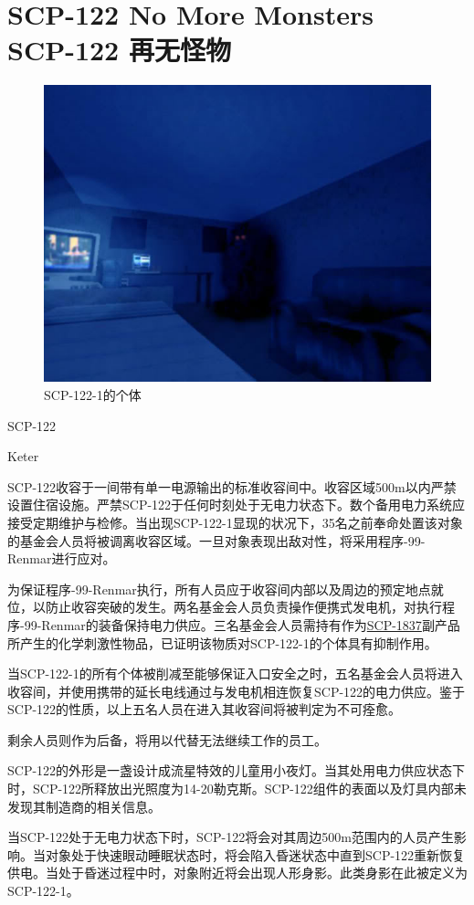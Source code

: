 \chapter[SCP-122 再无怪物]{
    SCP-122 No More Monsters\\
    SCP-122 再无怪物
}

\label{chap:SCP-122}

\begin{figure}[H]
    \centering
    \includegraphics[width=0.5\linewidth]{images/SCP-122.jpg}
    \caption*{SCP-122-1的个体}
\end{figure}

SCP-122

Keter

SCP-122收容于一间带有单一电源输出的标准收容间中。收容区域500m以内严禁设置住宿设施。严禁SCP-122于任何时刻处于无电力状态下。数个备用电力系统应接受定期维护与检修。当出现SCP-122-1显现的状况下，35名之前奉命处置该对象的基金会人员将被调离收容区域。一旦对象表现出敌对性，将采用程序-99-Renmar进行应对。

为保证程序-99-Renmar执行，所有人员应于收容间内部以及周边的预定地点就位，以防止收容突破的发生。两名基金会人员负责操作便携式发电机，对执行程序-99-Renmar的装备保持电力供应。三名基金会人员需持有作为\hyperref[chap:SCP-1837]{SCP-1837}副产品所产生的化学刺激性物品，已证明该物质对SCP-122-1的个体具有抑制作用。

当SCP-122-1的所有个体被削减至能够保证入口安全之时，五名基金会人员将进入收容间，并使用携带的延长电线通过与发电机相连恢复SCP-122的电力供应。鉴于SCP-122的性质，以上五名人员在进入其收容间将被判定为不可痊愈。

剩余人员则作为后备，将用以代替无法继续工作的员工。

SCP-122的外形是一盏设计成流星特效的儿童用小夜灯。当其处用电力供应状态下时，SCP-122所释放出光照度为14-20勒克斯。SCP-122组件的表面以及灯具内部未发现其制造商的相关信息。

当SCP-122处于无电力状态下时，SCP-122将会对其周边500m范围内的人员产生影响。当对象处于快速眼动睡眠状态时，将会陷入昏迷状态中直到SCP-122重新恢复供电。当处于昏迷过程中时，对象附近将会出现人形身影。此类身影在此被定义为SCP-122-1。

